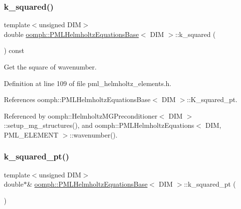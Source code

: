 \mbox{\label{classoomph_1_1PMLHelmholtzEquationsBase_a1028cc3fdde3e57ffdfac5cba8893418}} 
\subsubsection{\texorpdfstring{k\+\_\+squared()}{k\_squared()}}
{\footnotesize\ttfamily template$<$unsigned D\+IM$>$ \\
double \hyperlink{classoomph_1_1PMLHelmholtzEquationsBase}{oomph\+::\+P\+M\+L\+Helmholtz\+Equations\+Base}$<$ D\+IM $>$\+::k\+\_\+squared (\begin{DoxyParamCaption}{ }\end{DoxyParamCaption}) const\hspace{0.3cm}{\ttfamily [inline]}}



Get the square of wavenumber. 



Definition at line 109 of file pml\+\_\+helmholtz\+\_\+elements.\+h.



References oomph\+::\+P\+M\+L\+Helmholtz\+Equations\+Base$<$ D\+I\+M $>$\+::\+K\+\_\+squared\+\_\+pt.



Referenced by oomph\+::\+Helmholtz\+M\+G\+Preconditioner$<$ D\+I\+M $>$\+::setup\+\_\+mg\+\_\+structures(), and oomph\+::\+P\+M\+L\+Helmholtz\+Equations$<$ D\+I\+M, P\+M\+L\+\_\+\+E\+L\+E\+M\+E\+N\+T $>$\+::wavenumber().

\mbox{\label{classoomph_1_1PMLHelmholtzEquationsBase_a4bf59f545ac99cdf9e44f6cb365de08a}} 
\subsubsection{\texorpdfstring{k\+\_\+squared\+\_\+pt()}{k\_squared\_pt()}}
{\footnotesize\ttfamily template$<$unsigned D\+IM$>$ \\
double$\ast$\& \hyperlink{classoomph_1_1PMLHelmholtzEquationsBase}{oomph\+::\+P\+M\+L\+Helmholtz\+Equations\+Base}$<$ D\+IM $>$\+::k\+\_\+squared\+\_\+pt (\begin{DoxyParamCaption}{ }\end{DoxyParamCaption})\hspace{0.3cm}{\ttfamily [inline]}}



